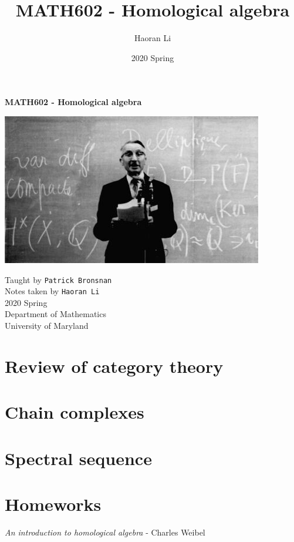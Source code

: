 \documentclass[a4paper,10pt]{article}
\title{MATH602 - Homological algebra}
\author{Haoran Li}
\date{2020 Spring}
\begin{document}
\sloppy %

\begin{titlepage}
\begin{center}
\vspace*{1cm}
\Huge
\textbf{MATH602 - Homological algebra} \\
\vspace{2cm}
\begin{center}
\includegraphics{Pictures/Henri_Cartan.png}
\end{center}
\vspace{2cm}
\normalsize
Taught by \texttt{Patrick Bronsnan} \\
Notes taken by \texttt{Haoran Li} \\
2020 Spring \\
\vspace{2cm}
Department of Mathematics\\
University of Maryland\\
\end{center}
\end{titlepage}

\tableofcontents
\newpage

\section{Review of category theory}

\newpage

\section{Chain complexes}

\newpage

\section{Spectral sequence}

\newpage

\section{Homeworks}

\newpage

\begin{thebibliography}{}

\textit{An introduction to homological algebra} - Charles Weibel

\end{thebibliography}

\printindex
\newpage
\end{document}
